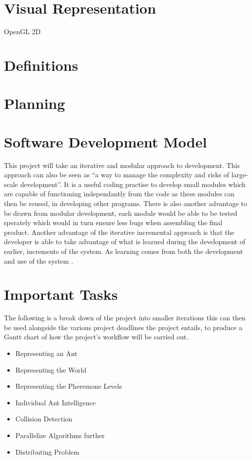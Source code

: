 \documentclass[main.tex]{subfiles}
\begin{document}
{{\section {Visual Representation}

OpenGL
2D

\section {Definitions}

\section{Planning}

\section{Software Development Model}
This project will take an iterative and modular approach to development. This approach can also be seen as ``a way to manage the complexity and risks of large-scale development''\cite{Larman2003}.  It is a useful coding practise to develop small modules which are capable of functioning independantly from the code as these modules can then be reused, in developing other programs. There is also another advantage to be drawn from modular development, each module would be able to be tested sperately which would in turn ensure less bugs when assembling the final product. Another advantage of the iterative incremental approach is that the developer is able to take advantage of what is learned during the development of earlier, increments of the system. As learning comes from both the development and use of the system \cite{Larman2003}.

\section{Important Tasks}
The following is a break down of the project into smaller iterations this can then be used alongside the various project deadlines the project entails, to produce a Gantt chart of how the project's workflow will be carried out.
\begin{itemize}
	\item Representing an Ant
	\item Representing the World
	\item Representing the Pheremone Levels
	\item Individual Ant Intelligence
	\item Collision Detection
	\item Parallelize Algorithms further
	\item Distributing Problem
\end{itemize}

}}
\end{document}
